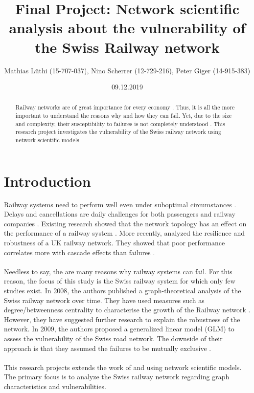 \documentclass{Resources/netsci-project}
\begin{document}

\title{Final Project: Network scientific analysis about the vulnerability of the Swiss Railway network}
\author{Mathias Lüthi (15-707-037), Nino Scherrer (12-729-216), Peter Giger (14-915-383)}
\date{09.12.2019}

\maketitle

\begin{abstract}
Railway networks are of great importance for every economy \autocite{Resilience}. Thus, it is all the more important to understand the reasons why and how they can fail. Yet, due to the size and complexity, their susceptibility to failures is not completely understood \autocite{Resilience}. This research project investigates the vulnerability of the Swiss railway network using network scientific models.
\end{abstract}


\section{Introduction}
Railway systems need to perform well even under suboptimal circumstances \autocite{Resilience}. Delays and cancellations are daily challenges for both passengers and railway companies \autocite{Resilience}. Existing research showed that the network topology has an effect on the performance of a railway system \autocite{ComplexTopology}. More recently, \textcite{Resilience} analyzed the resilience and robustness of a UK railway network. They showed that poor performance correlates more with cascade effects than failures \autocite{Resilience}.
\\~\\
Needless to say, the are many reasons why railway systems can fail. For this reason, the focus of this study is the Swiss railway system for which only few studies exist. In 2008, the authors \textcite{GraphSwiss} published a graph-theoretical analysis of the Swiss railway network over time. They have used measures such as degree/betweenness centrality to characterise the growth of the Railway network \autocite{GraphSwiss}. However, they have suggested further research to explain the robustness of the network. In 2009, the authors \textcite{VulnerabilitySwiss} proposed a generalized linear model (GLM) to assess the vulnerability of the Swiss road network. The downside of their approach is that they assumed the failures to be mutually exclusive \autocite{VulnerabilitySwiss}. 
\\~\\
This research projects extends the work of \textcite{GraphSwiss} and \textcite{VulnerabilitySwiss} using network scientific models. The primary focus is to analyze the Swiss railway network regarding graph characteristics and vulnerabilities.
\end{document}

